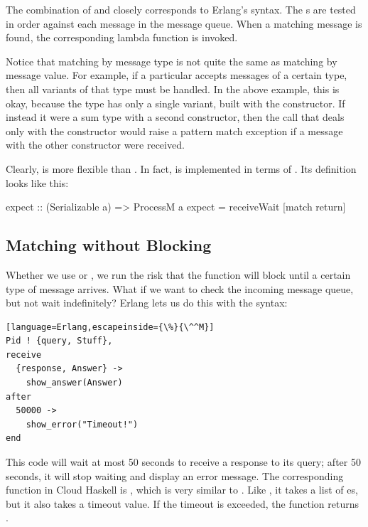 \documentclass[preprint]{sigplanconf}
\begin{document}
The combination of  and  closely corresponds to Erlang's  syntax. The s are tested in order against each message in the message queue. When a matching message is found, the corresponding lambda function is invoked. 

Notice that matching by message type is not quite the same as matching by message value. 
For example, if a particular  accepts messages of a certain type, then all variants of that type must be handled. 
In the above example, this is okay, because the  type has only a single variant, built with the  constructor. 
If instead it were a sum type with a second constructor, then the  call that deals only with the  constructor would raise a pattern match exception if a message with the other constructor were received.

Clearly,  is more flexible than . In fact,  is implemented in terms of . Its definition looks like this:

\begin{code}
expect :: (Serializable a) => ProcessM a
expect = receiveWait [match return]
\end{code}

\subsection{Matching without Blocking}

Whether we use  or , we run the risk that the function will block until a certain type of message arrives. What if we want to check the incoming message queue, but not wait indefinitely? Erlang lets us do this with the  syntax:

\begin{lstlisting}[language=Erlang,escapeinside={\%}{\^^M}]
Pid ! {query, Stuff},
receive
  {response, Answer} ->
    show_answer(Answer)
after
  50000 ->
    show_error("Timeout!")
end
\end{lstlisting}

This code will wait at most 50 seconds to receive a response to its query; after 50 seconds, it will stop waiting and display an error message. 
The corresponding function in Cloud Haskell is , which is very similar to . Like , it takes a list of es, but it also takes a timeout value. If the timeout is exceeded, the function returns .
\end{document}
